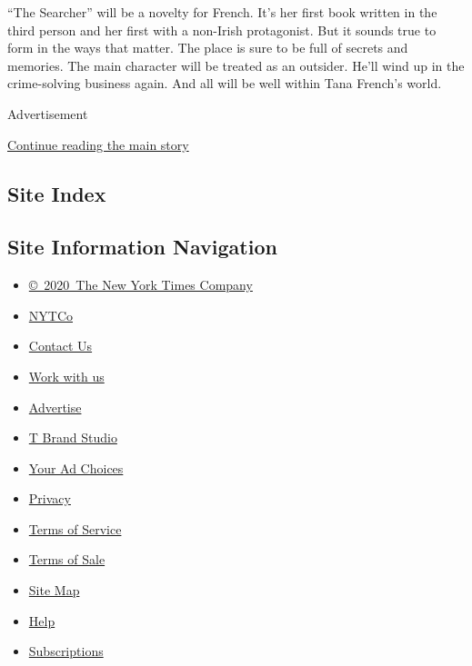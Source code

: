 ``The Searcher'' will be a novelty for French. It's her first book
written in the third person and her first with a non-Irish protagonist.
But it sounds true to form in the ways that matter. The place is sure to
be full of secrets and memories. The main character will be treated as
an outsider. He'll wind up in the crime-solving business again. And all
will be well within Tana French's world.

Advertisement

\protect\hyperlink{after-bottom}{Continue reading the main story}

\hypertarget{site-index}{%
\subsection{Site Index}\label{site-index}}

\hypertarget{site-information-navigation}{%
\subsection{Site Information
Navigation}\label{site-information-navigation}}

\begin{itemize}
\tightlist
\item
  \href{https://help.nytimes3xbfgragh.onion/hc/en-us/articles/115014792127-Copyright-notice}{©~2020~The
  New York Times Company}
\end{itemize}

\begin{itemize}
\tightlist
\item
  \href{https://www.nytco.com/}{NYTCo}
\item
  \href{https://help.nytimes3xbfgragh.onion/hc/en-us/articles/115015385887-Contact-Us}{Contact
  Us}
\item
  \href{https://www.nytco.com/careers/}{Work with us}
\item
  \href{https://nytmediakit.com/}{Advertise}
\item
  \href{http://www.tbrandstudio.com/}{T Brand Studio}
\item
  \href{https://www.nytimes3xbfgragh.onion/privacy/cookie-policy\#how-do-i-manage-trackers}{Your
  Ad Choices}
\item
  \href{https://www.nytimes3xbfgragh.onion/privacy}{Privacy}
\item
  \href{https://help.nytimes3xbfgragh.onion/hc/en-us/articles/115014893428-Terms-of-service}{Terms
  of Service}
\item
  \href{https://help.nytimes3xbfgragh.onion/hc/en-us/articles/115014893968-Terms-of-sale}{Terms
  of Sale}
\item
  \href{https://spiderbites.nytimes3xbfgragh.onion}{Site Map}
\item
  \href{https://help.nytimes3xbfgragh.onion/hc/en-us}{Help}
\item
  \href{https://www.nytimes3xbfgragh.onion/subscription?campaignId=37WXW}{Subscriptions}
\end{itemize}
